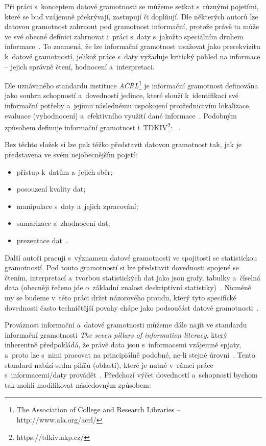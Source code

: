 Při práci s~konceptem datové gramotnosti se můžeme setkat s~různými pojetími, které se buď vzájemně překrývají, zastupují či doplňují. Dle některých autorů lze datovou gramotnost zahrnout pod gramotnost informační, protože právě ta může ve své obecné definici zahrnovat i~práci s~daty s~jakožto speciálním druhem informace~\parencite[126]{calzada13}. To znamená, že lze informační gramotnost uvažovat jako prerekvizitu k~datové gramotností, jelikož práce s~daty vyžaduje kritický pohled na informace -- jejich správně čtení, hodnocení a~interpretaci.

Dle uznávaného standardu instituce \emph{ACRL}\footnote{The Association of College and Research Libraries – http://www.ala.org/acrl/} je informační gramotnost definována jako souhrn schopností a~dovedností jedince, které slouží k~identifikaci své informační potřeby a~jejímu následnému uspokojení protřednictvím lokalizace, evaluace (vyhodnocení) a~efektivního využití dané informace~\parencite[2]{acrl14}. Podobným způsobem definuje informační gramotnost i~TDKIV\footnote{https://tdkiv.nkp.cz/}: ~\parencite{tdkiv03}.

Bez těchto složek si lze pak těžko představit datovou gramotnost tak, jak je představena ve svém nejobecnějším pojetí:

\begin{itemize}
\tightlist
\item
  přístup k~datům a~jejich sběr;
\item
  posouzení kvality dat;
\item
  manipulace s~daty a~jejich zpracování;
\item
  sumarizace a~zhodnocení dat;
\item
  prezentace dat~\parencite[8]{schield05}.
\end{itemize}

Další autoři pracují s~významem datové gramotnosti ve spojitosti se statistickou gramotností. Pod touto gramotností si lze představit dovednosti spojené se čtením, interpretací a~tvorbou statistických dat jako jsou grafy, tabulky a~číselná data (obecněji řečeno jde o~základní znalost deskriptivní statistiky)~\parencite[8]{schield05}. Nicméně my se budeme v~této práci držet názorového proudu, který tyto specifické dovednosti často techničtější povahy chápe jako podsoučást datové gramotnosti~\parencite[125]{calzada13}.

Prováznost informační a~datové gramotnosti můžeme dále najít ve standardu informační gramotnosti \emph{The seven pillars of information literacy}, který inherentně předpokládá, že právě data jsou s~informacemi vzájemně spjaty, a~proto lze s~nimi pracovat na principiálně podobné, ne-li stejné úrovni~\parencite[126]{calzada13}. Tento standard nabízí sedm pilířů (oblastí), které je nutné v~rámci práce s~informacemi/daty provádět~\parencite{sconul11}. Předchozí výčet dovedností a~schopností bychom tak mohli modifikovat následovným způsobem:


